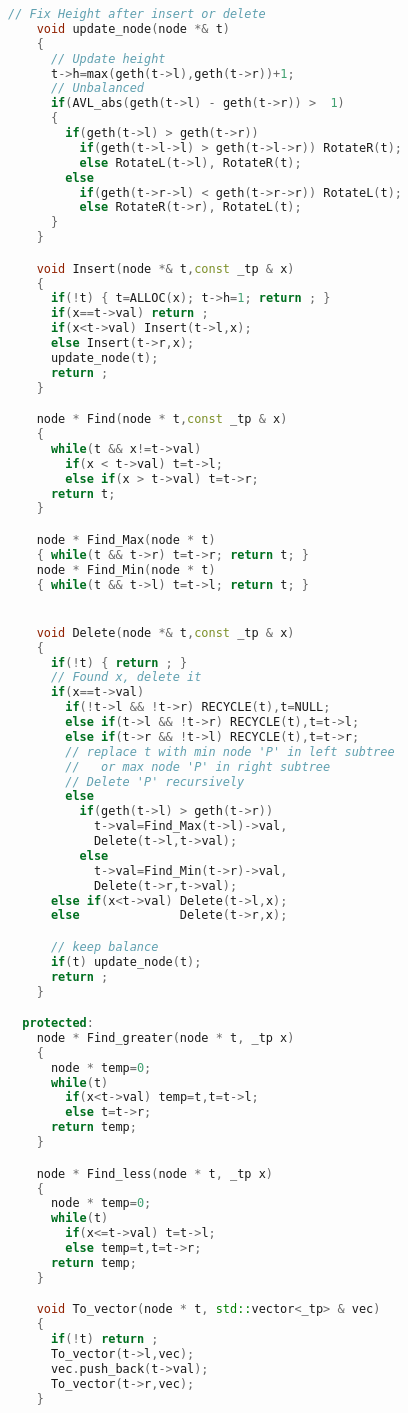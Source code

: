 \documentclass[UTF8]{report}
\numberwithin{figure}{subsection}
\numberwithin{table}{subsection}
\begin{document}
\begin{lstlisting}[language=c++]
    // Fix Height after insert or delete
    void update_node(node *& t)
    {
      // Update height
      t->h=max(geth(t->l),geth(t->r))+1;
      // Unbalanced
      if(AVL_abs(geth(t->l) - geth(t->r)) >  1)
      {
        if(geth(t->l) > geth(t->r))
          if(geth(t->l->l) > geth(t->l->r)) RotateR(t);
          else RotateL(t->l), RotateR(t);
        else 
          if(geth(t->r->l) < geth(t->r->r)) RotateL(t);
          else RotateR(t->r), RotateL(t);
      }
    }

    void Insert(node *& t,const _tp & x)
    {
      if(!t) { t=ALLOC(x); t->h=1; return ; }
      if(x==t->val) return ;
      if(x<t->val) Insert(t->l,x);
      else Insert(t->r,x);
      update_node(t);
      return ;
    }

    node * Find(node * t,const _tp & x)
    {
      while(t && x!=t->val)
        if(x < t->val) t=t->l;
        else if(x > t->val) t=t->r;
      return t;
    }

    node * Find_Max(node * t)
    { while(t && t->r) t=t->r; return t; }
    node * Find_Min(node * t)
    { while(t && t->l) t=t->l; return t; }


    void Delete(node *& t,const _tp & x)
    {
      if(!t) { return ; }
      // Found x, delete it
      if(x==t->val)
        if(!t->l && !t->r) RECYCLE(t),t=NULL;
        else if(t->l && !t->r) RECYCLE(t),t=t->l;
        else if(t->r && !t->l) RECYCLE(t),t=t->r;
        // replace t with min node 'P' in left subtree
        //   or max node 'P' in right subtree
        // Delete 'P' recursively
        else
          if(geth(t->l) > geth(t->r))
            t->val=Find_Max(t->l)->val,
            Delete(t->l,t->val);
          else 
            t->val=Find_Min(t->r)->val,
            Delete(t->r,t->val);
      else if(x<t->val) Delete(t->l,x);
      else              Delete(t->r,x);

      // keep balance
      if(t) update_node(t);
      return ;
    }

  protected:
    node * Find_greater(node * t, _tp x)
    {
      node * temp=0;
      while(t)
        if(x<t->val) temp=t,t=t->l;
        else t=t->r;
      return temp;
    }

    node * Find_less(node * t, _tp x)
    {
      node * temp=0;
      while(t)
        if(x<=t->val) t=t->l;
        else temp=t,t=t->r;
      return temp;
    }

    void To_vector(node * t, std::vector<_tp> & vec)
    {
      if(!t) return ;
      To_vector(t->l,vec);
      vec.push_back(t->val);
      To_vector(t->r,vec);
    }


\end{lstlisting}
\end{document}
